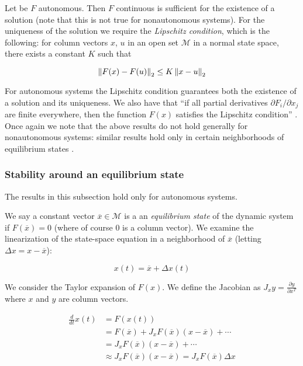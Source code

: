 Let be $F$ autonomous. Then $F$ continuous is sufficient for the existence of a solution (note that this is not true for nonautonomous systems). For the uniqueness of the solution we require the \emph{Lipschitz condition}, which is the following: for column vectors $x$, $u$ in an open set $\mathcal{M}$ in a normal state space, there exists a constant $K$ such that

\begin{equation*}
\left\lVert F(x) - F(u) \right\rVert_2 \leq K\left\lVert x - u \right\rVert_2
\end{equation*}

For autonomous systems the Lipschitz condition guarantees both the existence of a solution and its uniqueness. We also have that ``if all partial derivatives $\partial F_i / \partial x_j$ are finite everywhere, then the function $F(x)$ satisfies the Lipschitz condition'' \cite[p. 677]{Haykin:2009:NNC:1213811}. Once again we note that the above results do not hold generally for nonautonomous systems: similar results hold only in certain neighborhoods of equilibrium states \cite[Definition A.2, p. 194]{rasmussen2006attractivity}.

\subsubsection{Stability around an equilibrium state}

The results in this subsection hold only for autonomous systems.

We say a constant vector $\overline{x} \in \mathcal{M}$ is a an \emph{equilibrium state} of the dynamic system if $F(\overline{x}) = 0$ (where of course 0 is a column vector). We examine the linearization of the state-space equation in a neighborhood of $\overline{x}$ (letting $\Delta x = x - \overline{x}$):

\begin{equation*}
x(t) = \overline{x} + \Delta x(t)
\end{equation*}

We consider the Taylor expansion of $F(x)$. We define the Jacobian as $J_xy = \frac{\partial y}{\partial x^T}$ where $x$ and $y$ are column vectors.

\begin{align*}
  \frac{d}{dt}x(t) & = F(x(t)) \\
  & = F(\overline{x}) + J_x F(\overline{x})(x - \overline{x}) + \cdots \\
  & = J_x F(\overline{x})(x - \overline{x}) + \cdots \\
  & \approx J_x F(\overline{x})(x - \overline{x}) = J_x F(\overline{x}) \Delta x
\end{align*}
%

